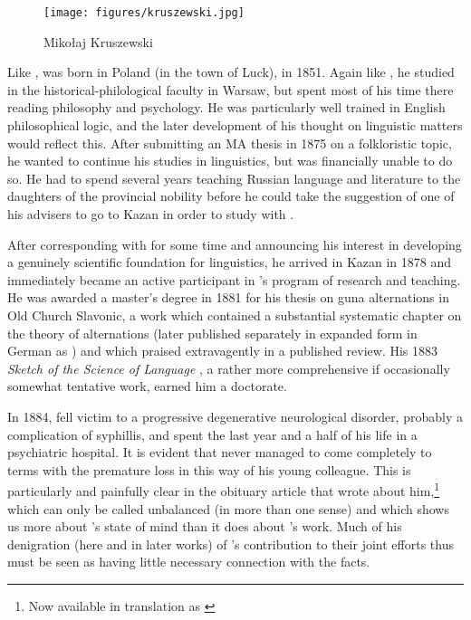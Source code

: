 \begin{wrapfigure}{r}{.4\textwidth}
  \texttt{[image: figures/kruszewski.jpg]}
  \caption{Mikołaj Kruszewski}
  \label{fig:ch.kazan_kruszewski}
\end{wrapfigure}
Like {\Baudouin}, {\Kruszewski} was born in Poland (in the town of Luck), in
1851. Again like {\Baudouin}, he studied in the historical-philological
faculty in Warsaw, but spent most of his time there reading philosophy
and psychology. He was particularly well trained in {English}
philosophical logic, and the later development of his thought on
linguistic matters would reflect this. After submitting an MA thesis
in 1875 on a folkloristic topic, he wanted to continue his studies in
linguistics, but was financially unable to do so. He had to spend
several years teaching {Russian} language and literature to the
daughters of the provincial nobility before he could take the
suggestion of one of his advisers to go to Kazan in order to study
with {\Baudouin}.

After corresponding with {\Baudouin} for some time and announcing his
interest in developing a genuinely scientific foundation for
linguistics, he arrived in Kazan in 1878 and immediately became an
active participant in {\Baudouin}'s program of research and teaching. He
was awarded a master's degree in 1881 for his thesis on guna
alternations in Old Church Slavonic, a work which contained a
substantial systematic chapter on the theory of alternations (later
published separately in expanded form in {German} as
\citealt{kruszewski81:alternation}) and which {\Baudouin} praised
extravagently in a published review. His 1883 \textsl{Sketch of the
  Science of Language} \citep{kruszewski83:outline}, a rather more
comprehensive if occasionally somewhat tentative work, earned him a
doctorate.

In 1884, {\Kruszewski} fell victim to a progressive degenerative
neurological disorder, probably a complication of syphillis, and spent
the last year and a half of his life in a psychiatric hospital.  It is
evident that {\Baudouin} never managed to come completely to terms with
the premature loss in this way of his young colleague. This is
particularly and painfully clear in the obituary article that {\Baudouin}
wrote about him,\footnote{Now available in translation as
  \citealt{baudouin05:kruszewski-obit-translated}} which can only be
called unbalanced (in more than one sense) and which shows us more
about {\Baudouin}'s state of mind than it does about {\Kruszewski}'s
work. Much of his denigration (here and in later works) of
{\Kruszewski}'s contribution to their joint efforts thus must be seen as
having little necessary connection with the facts.


